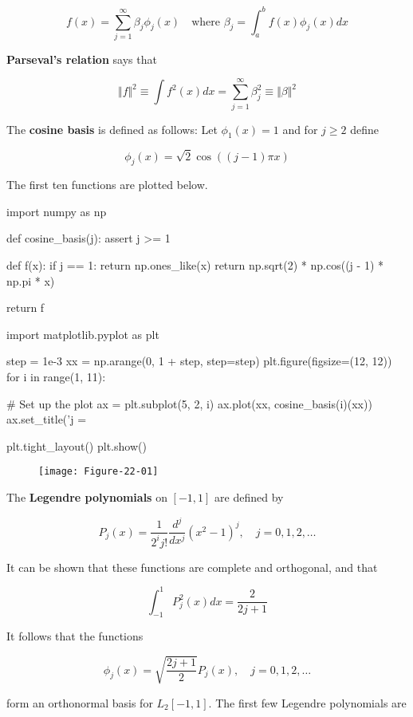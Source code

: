 \[ f(x) = \sum_{j=1}^\infty \beta_j \phi_j(x)
\quad \text{where } \beta_j = \int_a^b f(x) \phi_j(x) dx \]

\textbf{Parseval's relation} says that

\[ \Vert f \Vert^2 \equiv \int f^2(x) dx = \sum_{j=1}^\infty \beta_j^2 \equiv \Vert \beta \Vert^2\]

The \textbf{cosine basis} is defined as follows: Let \(\phi_1(x) = 1\)
and for \(j \geq 2\) define

\[\phi_j(x) = \sqrt{2} \cos \left( (j - 1) \pi x\right)\]

The first ten functions are plotted below.

\begin{python}
import numpy as np

def cosine_basis(j):
    assert j >= 1
    
    def f(x):
        if j == 1:
            return np.ones_like(x)   
        return np.sqrt(2) * np.cos((j - 1) * np.pi * x)
    
    return f
\end{python}

\begin{python}
import matplotlib.pyplot as plt

step = 1e-3
xx = np.arange(0, 1 + step, step=step)
plt.figure(figsize=(12, 12))
for i in range(1, 11):
    
    # Set up the plot
    ax = plt.subplot(5, 2, i)
    ax.plot(xx, cosine_basis(i)(xx))
    ax.set_title('j = %

plt.tight_layout()
plt.show()
\end{python}

\begin{figure}[H]
\texttt{[image: Figure-22-01]}
\end{figure}

The \textbf{Legendre polynomials} on \([-1, 1]\) are defined by

\[ P_j(x) = \frac{1}{2^i j!} \frac{d^j}{dx^j} (x^2 - 1)^j, \quad j = 0, 1, 2, \dots \]

It can be shown that these functions are complete and orthogonal, and
that

\[ \int_{-1}^1 P_j^2(x) dx = \frac{2}{2j + 1}\]

It follows that the functions

\[ \phi_j(x) = \sqrt{\frac{2j + 1}{2}}P_j(x), \quad j = 0, 1, 2, \dots \]

form an orthonormal basis for \(L_2[-1, 1]\). The first few Legendre
polynomials are

